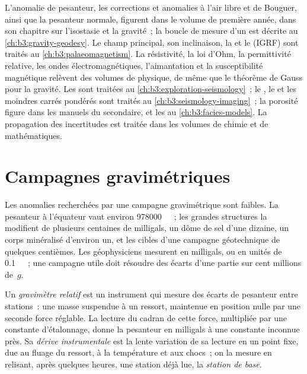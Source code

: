 \begin{recall}
L'anomalie de pesanteur, les corrections et anomalies à l'air libre et de Bouguer, ainsi que la
pesanteur normale, figurent dans le volume de première année, dans son chapitre sur l'isostasie
et la gravité~; la boucle de mesure d'un  est décrite au
\cref{ch:b3:gravity-geodesy}. Le champ principal, son inclinaison, la  et
le  (IGRF) sont traités au
\cref{ch:b3:palaeomagnetism}. La résistivité, la loi d'Ohm, la permittivité relative, les ondes
électromagnétiques, l'aimantation et la susceptibilité magnétique relèvent des volumes de physique,
de même que le théorème de Gauss pour la gravité. Les  sont
traitées au \cref{ch:b3:exploration-seismology}~; le , le 
et les moindres carrés pondérés sont traités au \cref{ch:b3:seismology-imaging}~; la porosité
figure dans les manuels du secondaire, et les  au \cref{ch:b3:facies-models}.
La propagation des incertitudes est traitée dans les volumes de chimie
et de mathématiques.
\end{recall}

\section{Campagnes gravimétriques}\label{sec:b3:field-lab-methods-3:gravity}

Les anomalies recherchées par une campagne gravimétrique sont faibles. La pesanteur à
l'équateur vaut environ \qty{978000}{\milli\gal}~; les grandes structures la modifient
de plusieurs centaines de milligals, un dôme de sel d'une dizaine,
un corps minéralisé d'environ un, et les cibles d'une campagne
géotechnique de quelques centièmes. Les géophysiciens mesurent en milligals,
ou en unités de \qty{0.1}{\milli\gal}~; une campagne utile doit résoudre
des écarts d'une partie sur cent millions de~$g$.

\begin{definition}\label{def:b3:field-lab-methods-3:gravimeter}
Un \emph{gravimètre relatif} est un instrument qui mesure des
écarts de pesanteur entre stations~: une masse suspendue à un ressort, maintenue
en position nulle par une seconde force réglable. La lecture du cadran de cette force,
multipliée par une constante d'étalonnage, donne la pesanteur en milligals à une constante
inconnue près. Sa \emph{dérive instrumentale} est la lente
variation de sa lecture en un point fixe,
due au fluage du ressort, à la température et aux chocs~; on la mesure en relisant, après
quelques heures, une station déjà lue, la
\emph{station de base}.
\end{definition}


